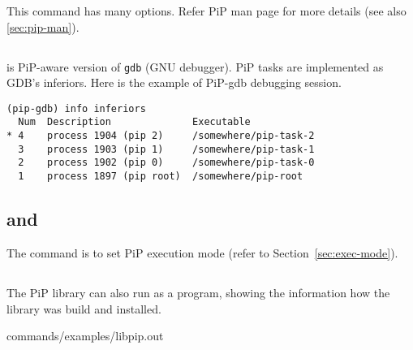 This  command has many options. Refer PiP man page for
more details (see also \ref{sec:pip-man}). 

\subsection{}\label{sec:pip-gdb}

 is PiP-aware version of {\tt gdb} (GNU
debugger). PiP tasks are implemented as GDB's inferiors. Here is the
example of PiP-gdb debugging session.

\begin{lstlisting}[frame=tRBl]
(pip-gdb) info inferiors
  Num  Description              Executable
* 4    process 1904 (pip 2)     /somewhere/pip-task-2
  3    process 1903 (pip 1)     /somewhere/pip-task-1
  2    process 1902 (pip 0)     /somewhere/pip-task-0
  1    process 1897 (pip root)  /somewhere/pip-root
\end{lstlisting}

\subsection{ and }

The  command is to set PiP execution mode (refer to
Section~\ref{sec:exec-mode}). 

\subsection{}

The PiP library  can also run as a program, showing the
information how the library was build and installed.


                {commands/examples/libpip.out}
